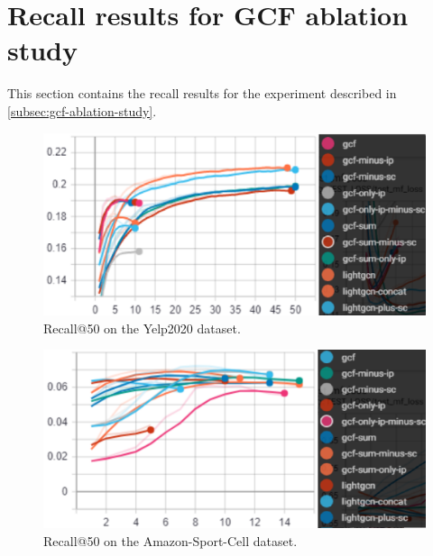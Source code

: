 \section{Recall results for GCF ablation study}\label{app:recall-results-gcf-ablation}
This section contains the recall results for the experiment described in \autoref{subsec:gcf-ablation-study}.
\begin{figure}[h!]
    \includegraphics[width=\linewidth]{figures/gcf-all-recall.png}
    \caption{Recall@50 on the Yelp2020 dataset.}
    \label{fig:GCF-recall-ablation-study}
\end{figure}

\begin{figure}[h!]
    \includegraphics[width=\linewidth]{figures/amazon-cell-sport-gcf-all-recall.png}
    \caption{Recall@50 on the Amazon-Sport-Cell dataset.}
    \label{fig:GCF-recall-ablation-study-amazon-cell-sport}
\end{figure}

